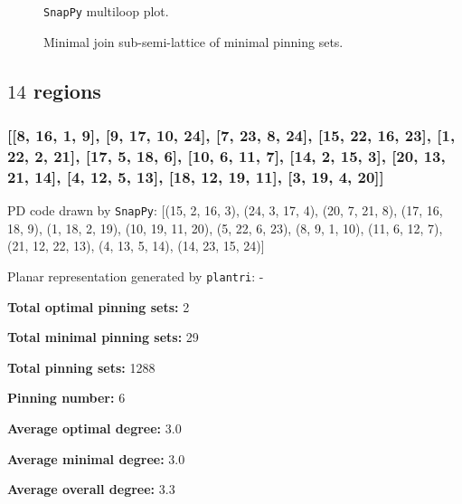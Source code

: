 \documentclass{article}%
\begin{document}
\begin{multicols}{2}
\begin{figure}[H]
\centering

\caption{\texttt{SnapPy} multiloop plot.}
\label{fig:tex/img/[[6, 12, 1, 7], [7, 13, 8, 22], [5, 21, 6, 22], [11, 14, 12, 15], [1, 14, 2, 13], [8, 18, 9, 17], [4, 16, 5, 17], [20, 15, 21, 16], [10, 19, 11, 20], [2, 19, 3, 18], [9, 3, 10, 4]].svg}
\end{figure}
\columnbreak

\begin{figure}[H]
\centering
\scalebox{0.8}{}
\caption{Minimal join sub-semi-lattice of minimal pinning sets.}
\label{fig:tex/img/[[6, 12, 1, 7], [7, 13, 8, 22], [5, 21, 6, 22], [11, 14, 12, 15], [1, 14, 2, 13], [8, 18, 9, 17], [4, 16, 5, 17], [20, 15, 21, 16], [10, 19, 11, 20], [2, 19, 3, 18], [9, 3, 10, 4]].pgf}
\end{figure}
\end{multicols}

\newpage

\subsection{$14$ regions}

\subsubsection{[[8, 16, 1, 9], [9, 17, 10, 24], [7, 23, 8, 24], [15, 22, 16, 23], [1, 22, 2, 21], [17, 5, 18, 6], [10, 6, 11, 7], [14, 2, 15, 3], [20, 13, 21, 14], [4, 12, 5, 13], [18, 12, 19, 11], [3, 19, 4, 20]]}

{\small\noindent PD code drawn by \texttt{SnapPy}: [(15, 2, 16, 3), (24, 3, 17, 4), (20, 7, 21, 8), (17, 16, 18, 9), (1, 18, 2, 19), (10, 19, 11, 20), (5, 22, 6, 23), (8, 9, 1, 10), (11, 6, 12, 7), (21, 12, 22, 13), (4, 13, 5, 14), (14, 23, 15, 24)]}

{\small\noindent Planar representation generated by \texttt{plantri}: -}

\begin{multicols}{2}
{\normalsize \noindent\textbf{Total optimal pinning sets:} 2

\noindent\textbf{Total minimal pinning sets:} 29

\noindent\textbf{Total pinning sets:} 1288

\noindent\textbf{Pinning number:} 6

}
\columnbreak

{\normalsize \noindent\textbf{Average optimal degree:} 3.0

\noindent\textbf{Average minimal degree:} 3.0

\noindent\textbf{Average overall degree:} 3.3

}
\end{multicols}
\end{document}

